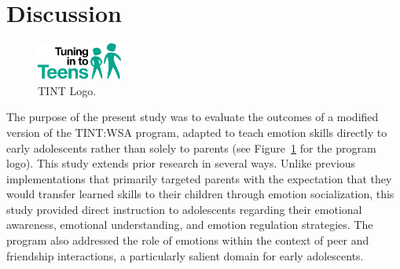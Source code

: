 \section{Discussion}

\begin{figure}     \centering       
\includegraphics[width=0.25\textwidth]{TINT.png}
\caption{\label{fig:TINT} TINT Logo.}
\end{figure}

The purpose of the present study was to evaluate the outcomes of a modified version of the TINT:WSA program, adapted to teach emotion skills directly to early adolescents rather than solely to parents (see Figure~\ref{fig:TINT} for the program logo). This study extends prior research in several ways. Unlike previous implementations that primarily targeted parents with the expectation that they would transfer learned skills to their children through emotion socialization, this study provided direct instruction to adolescents regarding their emotional awareness, emotional understanding, and emotion regulation strategies. The program also addressed the role of emotions within the context of peer and friendship interactions, a particularly salient domain for early adolescents. 




